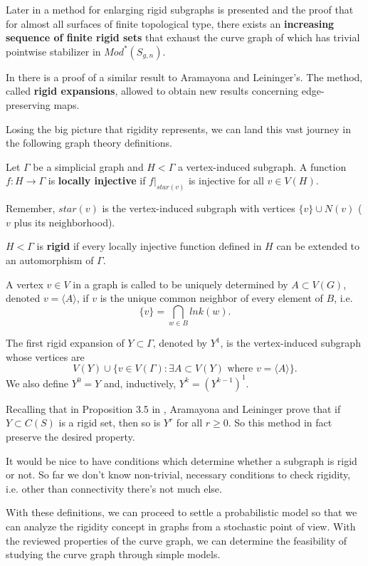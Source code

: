 Later in \cite[Aramayona, Leininger 16]{exhaustingCurveComplex} a method for enlarging rigid subgraphs is presented and the proof that for almost all surfaces of finite topological type, there exists an \textbf{increasing sequence of finite rigid sets} that exhaust the curve graph of which has trivial pointwise stabilizer in $Mod^{\ast}(S_{g,n})$.

In \cite[Hernández 19]{exhaustionCurveGraph} there is a proof of a similar result to Aramayona and Leininger's. The method,  called \textbf{rigid expansions}, allowed to obtain new results concerning edge-preserving maps. 

Losing the big picture that rigidity represents, we can land this vast journey in the following graph theory definitions.

\begin{defini}
Let $\Gamma$ be a simplicial graph and $H<\Gamma$ a vertex-induced subgraph. A function $f:H\to \Gamma$ is \textbf{locally injective} if $f|_{star(v)}$ is injective for all $v \in V(H)$. 
\end{defini}

\begin{nota}
Remember, $star(v)$ is the vertex-induced subgraph with vertices $\{ v \} \cup N(v)$ ($v$ plus its neighborhood).
\end{nota}

\begin{defini}
$H<\Gamma$ is \textbf{rigid} if every locally injective function defined in $H$ can be extended to an automorphism of $\Gamma$. \end{defini}

A vertex $v \in V$ in a graph is called to be uniquely determined by $A\subset V(G)$, denoted $v=\langle A \rangle$, if $v$ is the unique common neighbor of every element of $B$, i.e.
$$ \{ v \} = \bigcap_{w\in B} lnk(w).$$
\begin{defini}
The first rigid expansion of $Y\subset \Gamma$, denoted by $Y^{1}$, is the vertex-induced subgraph whose vertices are
$$ V(Y) \cup \{ v\in V(\Gamma) :  \exists A \subset V(Y) \text{ where } v = \langle A \rangle  \}.$$
We also define $Y^{0} = Y$ and, inductively, $Y^{k} = (Y^{k-1})^{1}$.
\end{defini}

Recalling that in Proposition 3.5 in \cite[Aramayona, Leininger 16]{finiteRigidSetsJA}, Aramayona and Leininger prove that if $Y \subset C(S)$ is a rigid set, then so is $Y^{r} $ for all $r \geq 0$. So this method in fact preserve the desired property.

It would be nice to have conditions which determine whether a subgraph is rigid or not. So far we don't know non-trivial, necessary conditions to check rigidity, i.e. other than connectivity there's not much else.

With these definitions, we can proceed to settle a probabilistic model so that we can analyze the rigidity concept in graphs from a stochastic point of view. With the reviewed properties of the curve graph, we can determine the feasibility of studying the curve graph through simple models.